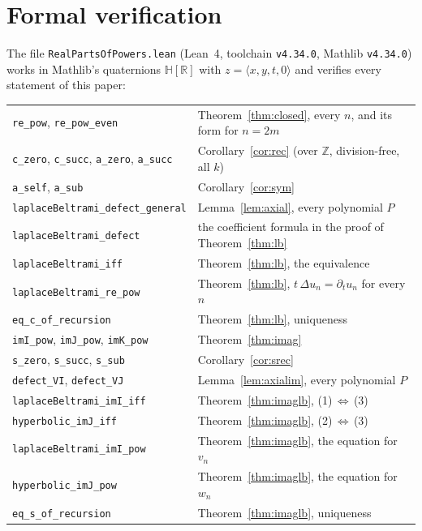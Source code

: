 \documentclass[11pt,a4paper]{article}
\newcommand{\R}{\mathbb{R}}
\newcommand{\HH}{\mathbb{H}}
\newcommand{\lean}[1]{\texttt{#1}}
\theoremstyle{remark}
\begin{document}
\section{Formal verification}

The file \texttt{RealPartsOfPowers.lean} (Lean~4, toolchain \texttt{v4.34.0}, Mathlib
\texttt{v4.34.0}) works in Mathlib's quaternions $\HH[\R]$ with $z=\langle x,y,t,0\rangle$ and
verifies every statement of this paper:

{\small
\begin{longtable}{@{}>{\raggedright\arraybackslash}p{}>{\raggedright\arraybackslash}p{}@{}}
  \lean{re\_pow}, \lean{re\_pow\_even} & Theorem~\ref{thm:closed}, every $n$, and its form for $n=2m$\\
  \lean{c\_zero}, \lean{c\_succ}, \lean{a\_zero}, \lean{a\_succ} & Corollary~\ref{cor:rec} (over $\mathbb{Z}$, division-free, all $k$)\\
  \lean{a\_self}, \lean{a\_sub} & Corollary~\ref{cor:sym}\\
  \lean{laplaceBeltrami\_defect\_general} & Lemma~\ref{lem:axial}, every polynomial $P$\\
  \lean{laplaceBeltrami\_defect} & the coefficient formula in the proof of Theorem~\ref{thm:lb}\\
  \lean{laplaceBeltrami\_iff} & Theorem~\ref{thm:lb}, the equivalence\\
  \lean{laplaceBeltrami\_re\_pow} & Theorem~\ref{thm:lb}, $t\,\Delta u_n=\partial_tu_n$ for every $n$\\
  \lean{eq\_c\_of\_recursion} & Theorem~\ref{thm:lb}, uniqueness\\
  \lean{imI\_pow}, \lean{imJ\_pow}, \lean{imK\_pow} & Theorem~\ref{thm:imag}\\
  \lean{s\_zero}, \lean{s\_succ}, \lean{s\_sub} & Corollary~\ref{cor:srec}\\
  \lean{defect\_VI}, \lean{defect\_VJ} & Lemma~\ref{lem:axialim}, every polynomial $P$\\
  \lean{laplaceBeltrami\_imI\_iff} & Theorem~\ref{thm:imaglb}, (1)\,$\Leftrightarrow$\,(3)\\
  \lean{hyperbolic\_imJ\_iff} & Theorem~\ref{thm:imaglb}, (2)\,$\Leftrightarrow$\,(3)\\
  \lean{laplaceBeltrami\_imI\_pow} & Theorem~\ref{thm:imaglb}, the equation for $v_n$\\
  \lean{hyperbolic\_imJ\_pow} & Theorem~\ref{thm:imaglb}, the equation for $w_n$\\
  \lean{eq\_s\_of\_recursion} & Theorem~\ref{thm:imaglb}, uniqueness\\

\end{longtable}}
\end{document}
